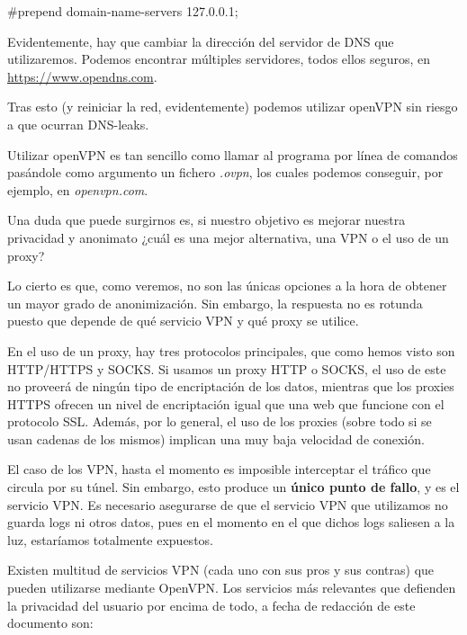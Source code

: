 	{\selectfont 
		\#prepend domain-name-servers 127.0.0.1;
	}

	Evidentemente, hay que cambiar la dirección del servidor de DNS que utilizaremos. Podemos encontrar múltiples servidores, todos ellos seguros, en \url{https://www.opendns.com}.
	
	Tras esto (y reiniciar la red, evidentemente) podemos utilizar openVPN sin riesgo a que ocurran DNS-leaks.
	
	Utilizar openVPN es tan sencillo como llamar al programa por línea de comandos pasándole como argumento un fichero \textit{.ovpn}, los cuales podemos conseguir, por ejemplo, en \textit{openvpn.com}.
	
	Una duda que puede surgirnos es, si nuestro objetivo es mejorar nuestra privacidad y anonimato ¿cuál es una mejor alternativa, una VPN o el uso de un proxy? 
	
	Lo cierto es que, como veremos, no son las únicas opciones a la hora de obtener un mayor grado de anonimización. Sin embargo, la respuesta no es rotunda puesto que depende de qué servicio VPN y qué proxy se utilice.
	
	En el uso de un proxy, hay tres protocolos principales, que como hemos visto son HTTP/HTTPS y SOCKS.
	Si usamos un proxy HTTP o SOCKS, el uso de este no proveerá de ningún tipo de encriptación de los datos, mientras que los proxies HTTPS ofrecen un nivel de encriptación igual que una web que funcione con el protocolo SSL. Además, por lo general, el uso de los proxies (sobre todo si se usan cadenas de los mismos) implican una muy baja velocidad de conexión.
	
	El caso de los VPN, hasta el momento es imposible interceptar el tráfico que circula por su túnel. Sin embargo, esto produce un \textbf{único punto de fallo}, y es el servicio VPN. Es necesario asegurarse de que el servicio VPN que utilizamos no guarda logs ni otros datos, pues en el momento en el que dichos logs saliesen a la luz, estaríamos totalmente expuestos.
	
	Existen multitud de servicios VPN (cada uno con sus pros y sus contras) que pueden utilizarse mediante OpenVPN. Los servicios más relevantes que defienden la privacidad del usuario por encima de todo, a fecha de redacción de este documento son:
	

